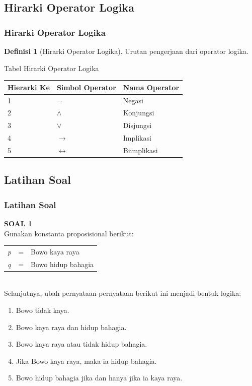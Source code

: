 \documentclass[handout]{beamer}
\theoremstyle{definition}
\newtheorem{definisi}[theorem]{Definisi}
\theoremstyle{example}
\begin{document}
\subsection{Hirarki Operator Logika}
\begin{frame}
	\frametitle{Hirarki Operator Logika}
  \begin{definisi}[Hirarki Operator Logika]
  	Urutan pengerjaan dari operator logika.
  \end{definisi}
  \begin{block}{Tabel Hirarki Operator Logika }
  \begin{tabular}{ | l | l | l |}
  	\hline
  	Hierarki Ke & Simbol Operator & Nama Operator \\ \hline
  	1 & $\neg$ & Negasi \\ \hline
  	2 & $\wedge$ & Konjungsi \\ \hline
  	3 & $\vee$ & Disjungsi \\ \hline
  	4 & $\rightarrow$ & Implikasi \\ \hline
  	5 & $\leftrightarrow$ & Biimplikasi \\     		 
  	\hline
  \end{tabular}
  \end{block}
\end{frame}

\subsection{Latihan Soal}
\begin{frame}
	\frametitle{Latihan Soal}
	\textbf{SOAL 1}\\	
	Gunakan konstanta proposisional berikut:\\	 
	\begin{tabular}{l c l}
      \textit{p} & = & Bowo kaya raya\\
      \textit{q} & = & Bowo hidup bahagia
    \end{tabular}\\	
	Selanjutnya, ubah pernyataan-pernyataan berikut ini menjadi bentuk logika:\\	
	\begin{enumerate}
		\item Bowo tidak kaya.
		\item Bowo kaya raya dan hidup bahagia.
		\item Bowo kaya raya atau tidak hidup bahagia.
		\item Jika Bowo kaya raya, maka ia hidup bahagia.
		\item Bowo hidup bahagia jika dan hanya jika ia kaya raya.
	\end{enumerate}		
\end{frame}
\end{document}
